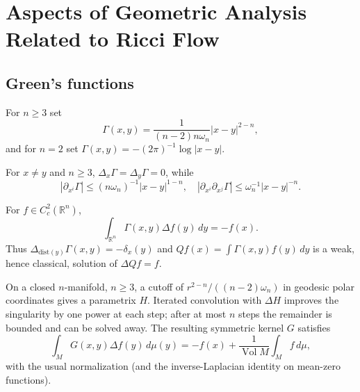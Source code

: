 \chapter{Aspects of Geometric Analysis Related to Ricci Flow}
\label{ch:chow-ii-geometric-analysis}

\section{Green's functions}

\begin{definition}
\label{def:chow-ii-euclidean-green-function}
For $n\ge3$ set
\[
\Gamma(x,y)=\frac{1}{(n-2)n\omega_n}|x-y|^{2-n},
\]
and for $n=2$ set $\Gamma(x,y)=-(2\pi)^{-1}\log|x-y|$.
\end{definition}

\begin{lemma}
\label{lem:chow-ii-euclidean-green-identities}
For $x\ne y$ and $n\ge3$, $\Delta_x\Gamma=\Delta_y\Gamma=0$, while
\[
|\partial_{x^i}\Gamma|\le(n\omega_n)^{-1}|x-y|^{1-n},
\quad |\partial_{x^i}\partial_{x^j}\Gamma|\le\omega_n^{-1}|x-y|^{-n}.
\]
\end{lemma}

\begin{theorem}
\label{thm:chow-ii-euclidean-green-fundamental}
For $f\in C_c^2(\mathbb R^n)$,
\[
\int_{\mathbb R^n}\Gamma(x,y)\Delta f(y)\,dy=-f(x).
\]
Thus $\Delta_{\mathrm{dist}(y)}\Gamma(x,y)=-\delta_x(y)$ and
$Qf(x)=\int\Gamma(x,y)f(y)\,dy$ is a weak, hence classical, solution of
$\Delta Qf=f$.
\end{theorem}

\begin{theorem}
\label{thm:chow-ii-closed-manifold-green-function}
On a closed $n$-manifold, $n\ge3$, a cutoff of
$r^{2-n}/((n-2)\omega_n)$ in geodesic polar coordinates gives a parametrix
$H$.  Iterated convolution with $\Delta H$ improves the singularity by one
power at each step; after at most $n$ steps the remainder is bounded and can
be solved away.  The resulting symmetric kernel $G$ satisfies
\[
\int_M G(x,y)\Delta f(y)\,d\mu(y)=-f(x)+\frac1{\operatorname{Vol}M}\int_M f\,d\mu,
\]
with the usual normalization (and the inverse-Laplacian identity on mean-zero
functions).
\end{theorem}

